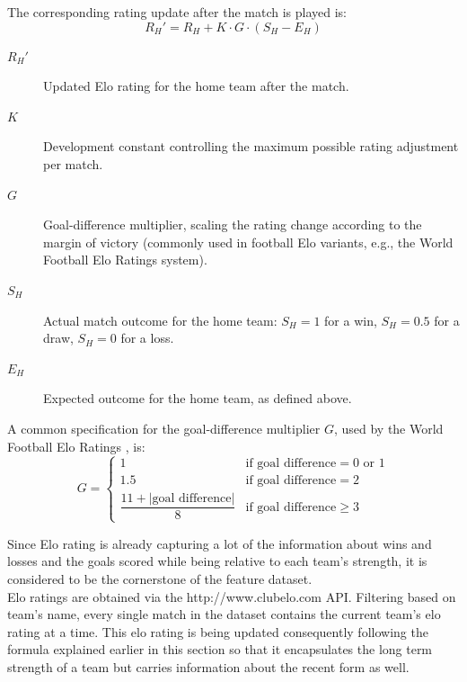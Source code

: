 \documentclass{article}
\begin{document}
The corresponding rating update after the match is played is:
\begin{equation}
R_H' = R_H + K \cdot G \cdot \left( S_H - E_H \right)
\end{equation}

\begin{description}
    \item[$R_H'$] Updated Elo rating for the home team after the match.
    \item[$K$] Development constant controlling the maximum possible rating adjustment per match.
    \item[$G$] Goal-difference multiplier, scaling the rating change according to the margin of victory (commonly used in football Elo variants, e.g., the World Football Elo Ratings system).
    \item[$S_H$] Actual match outcome for the home team: $S_H = 1$ for a win, $S_H = 0.5$ for a draw, $S_H = 0$ for a loss.
    \item[$E_H$] Expected outcome for the home team, as defined above.
\end{description}

A common specification for the goal-difference multiplier $G$, used by the World Football Elo Ratings \cite{Elo}, is:
\begin{equation}
G =
\begin{cases}
1 & \text{if goal difference} = 0 \text{ or } 1 \\
1.5 & \text{if goal difference} = 2 \\
\dfrac{11 + \left| \text{goal difference} \right|}{8} & \text{if goal difference} \geq 3
\end{cases}
\end{equation}

Since Elo rating is already capturing a lot of the information about wins and losses and the goals scored while being relative to each team's strength, it is considered to be the cornerstone of the feature dataset. 
\\
Elo ratings are obtained via the http://www.clubelo.com API. Filtering based on team's name, every single match in the dataset contains the current team's elo rating at a time. This elo rating is being updated consequently following the formula explained earlier in this section so that it encapsulates the long term strength of a team but carries information about the recent form as well. 
\end{document}
